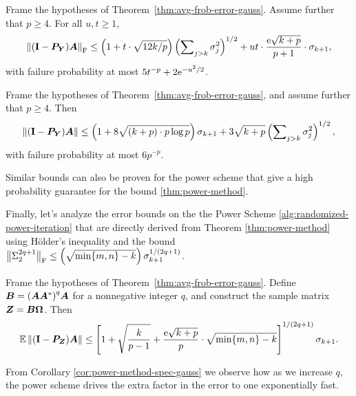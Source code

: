 \begin{theorem} \label{thm:tail-frob-error-gauss}
Frame the hypotheses of Theorem~\ref{thm:avg-frob-error-gauss}.
Assume further that $p \geq 4$.  For all $u, t \geq 1$,
$$
\fnorm{ (\Id - \mtx{P}_{\mtx{Y}}) \mtx{A} }
    \leq \left( 1 + t \cdot \sqrt{12k/p} \right)
    \left( \sum\nolimits_{j > k} \sigma_j^2 \right)^{1/2}
    + ut \cdot \frac{\econst\sqrt{k+p}}{p+1} \cdot \sigma_{k+1},
$$
with failure probability at most $5 t^{-p} + 2 \econst^{-u^2/2}$.
\end{theorem}

\begin{theorem} \label{thm:tail-spec-error-gauss}
Frame the hypotheses of Theorem~\ref{thm:avg-frob-error-gauss}, and assume further that $p \geq 4$.  Then
$$
\norm{ (\Id - \mtx{P}_{\mtx{Y}}) \mtx{A} }
    \leq \left( 1 + 8 \sqrt{(k + p) \cdot p \log p} \right) \sigma_{k+1}
        + 3 \sqrt{k+p} \left( \sum\nolimits_{j > k} \sigma_j^2 \right)^{1/2},
$$
with failure probability at most $6 p^{-p}$.
\end{theorem}
Similar bounds can also be proven for the power scheme 
\cite{halko2011finding} that give a high probability guarantee for 
the bound \ref{thm:power-method}.

Finally, let's analyze the error bounds on the 
the Power Scheme \ref{alg:randomized-power-iteration} that are directly
derived from Theorem \ref{thm:power-method} using H{\"o}lder's inequality
and the bound $\smnorm{\rm F}{\Sigma_2^{2q+1}}\leq\left(\sqrt{ \min\{m,n\} - k }\right)\sigma_{k+1}^{1/(2q+1)}$.

\begin{corollary}
\label{cor:power-method-spec-gauss}
Frame the hypotheses of Theorem~\ref{thm:avg-frob-error-gauss}.
Define $\mtx{B} = {(\mtx{A}\mtx{A}^\adj)}^{q} \mtx{A}$ for a
nonnegative integer $q$, and construct the sample matrix $\mtx{Z} =
\mtx{B\Omega}$.  Then
$$
\Expect \norm{(\Id - \mtx{P}_{\mtx{Z}}) \mtx{A}}
    \leq \left[ 1 + \sqrt{\frac{k}{p-1}}
    + \frac{\econst\sqrt{k+p}}{p} \cdot \sqrt{ \min\{m,n\} - k } \right]^{1/(2q+1)}
    \sigma_{k+1}.
$$
\end{corollary}

From Corollary \ref{cor:power-method-spec-gauss} we observe how as we increase
$q$, the power scheme drives the extra factor in the error to one
exponentially fast.
\newpage
